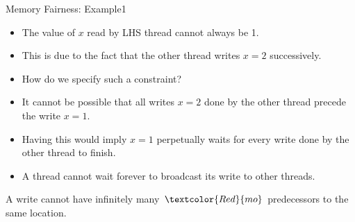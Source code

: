 \documentclass[dvipsnames, notes]{beamer}
\newcommand{\mo}{\textcolor{Red}{mo}}
\begin{document}
    \begin{frame}{Memory Fairness: Example1}
      
      \begin{figure}
      \end{figure}
      
      \begin{itemize}
        \item The value of $x$ read by LHS thread cannot always be 1.
        \item This is due to the fact that the other thread writes $x=2$ successively. 
        \item How do we specify such a constraint?
      \end{itemize}

    \end{frame}

    \begin{frame}

      \begin{figure}
      \end{figure}

      \begin{itemize}
        \item It cannot be possible that all writes $x=2$ done by the other thread precede the write $x=1$.
        \item Having this would imply $x=1$ perpetually waits for every write done by the other thread to finish. 
        \item A thread cannot wait forever to broadcast its write to other threads.
      \end{itemize}

      \begin{center}
        A write cannot have infinitely many $\mo$ predecessors to the same location.
      \end{center}
      
    \end{frame}
\end{document}
